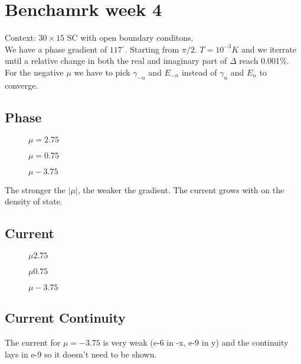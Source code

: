 \documentclass[../main.tex]{subfiles}
\begin{document}
\section{Benchamrk week 4}
Context: $30\times 15$ SC with open boundary conditons.\\

We have a phase gradient of $117^{\circ}$. Starting from $\pi/2$. $T=10^{-3}K$ and we iterrate until a relative
change in both the real and imaginary part of $\Delta$ reach 0.001\%. \\

For the negative $\mu$ we have to pick $\gamma_{-n}$ and $E_{-n}$ instead of $\gamma_{n}$ and $E_{n}$ to converge.
\subsection{Phase}
\begin{figure}[H]
    \centering
    
    \caption{$\mu=2.75$}
\end{figure}
\begin{figure}[H]
    \centering
    
    \caption{$\mu=0.75$}
\end{figure}

\begin{figure}[H]
    \centering
    
    \caption{$\mu -3.75$}
\end{figure}
The stronger the $|\mu|$, the weaker the gradient. The current grows with on the density of state.

\subsection{Current}
\begin{figure}[H]
    \centering
    
    \caption{$\mu 2.75$}
\end{figure}
\begin{figure}[H]
    \centering
    
    \caption{$\mu 0.75$}
\end{figure}
\begin{figure}[H]
    \centering
    
    \caption{$\mu -3.75$}
\end{figure}

\subsection{Current Continuity}
\begin{figure}[H]
    \centering
    
\end{figure}
\begin{figure}[H]
    \centering
    
\end{figure}
The current for $\mu=-3.75$ is very weak (e-6 in -x, e-9 in y) and the continuity lays in e-9 so it doesn't need to be shown.
\end{document}
